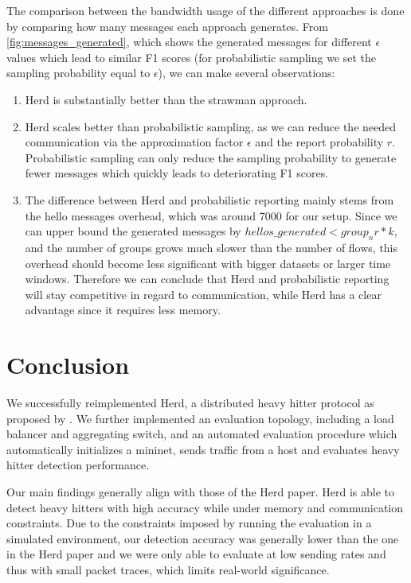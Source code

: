 \documentclass[11pt,oneside,a4paper]{article}
\begin{document}
\newpage

The comparison between the bandwidth usage of the different approaches is done by comparing how many messages each approach generates. From \ref{fig:messages_generated}, which shows the generated messages for different $\epsilon$ values which lead to similar F1 scores (for probabilistic sampling we set the sampling probability equal to $\epsilon$), we can make several observations:

\begin{enumerate}
	\item Herd is substantially better than the strawman approach.
	\item Herd scales better than probabilistic sampling, as we can reduce the needed communication via the approximation factor $\epsilon$ and the report probability $r$. Probabilistic sampling can only reduce the sampling probability to generate fewer messages which quickly leads to deteriorating F1 scores.
	\item  The difference between Herd and probabilistic reporting mainly stems from the hello messages overhead, which was around 7000 for our setup. Since we can upper bound the generated messages by $hellos\_generated < group_nr * k$, and the number of groups grows much slower than the number of flows, this overhead should become less significant with bigger datasets or larger time windows. Therefore we can conclude that Herd and probabilistic reporting will stay competitive in regard to communication, while Herd has a clear advantage since it requires less memory.
\end{enumerate}




\section{Conclusion}

We successfully reimplemented Herd, a distributed heavy hitter protocol as proposed by \cite{anon2019herd}. We further implemented an evaluation topology, including a load balancer and aggregating switch, and an automated evaluation procedure which automatically initializes a mininet, sends traffic from a host and evaluates heavy hitter detection performance.

\noindent Our main findings generally align with those of the Herd paper. Herd is able to detect heavy hitters with high accuracy while under memory and communication constraints. Due to the constraints imposed by running the evaluation in a simulated environment, our detection accuracy was generally lower than the one in the Herd paper and we were only able to evaluate at low sending rates and thus with small packet traces, which limits  real-world significance.
\end{document}
